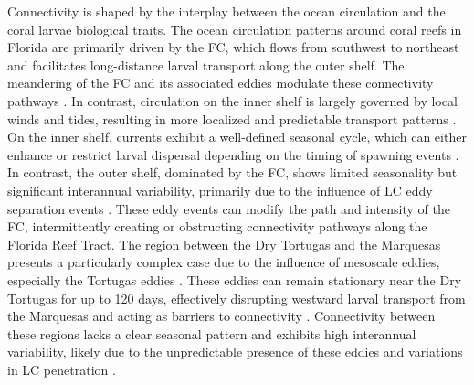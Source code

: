 \documentclass[preprint,12pt,authoryear]{elsarticle}
\begin{document}
	Connectivity is shaped by the interplay between the ocean circulation and the coral larvae biological traits. The ocean circulation patterns around coral reefs in Florida are primarily driven by the FC, which flows from southwest to northeast and facilitates long-distance larval transport along the outer shelf. The meandering of the FC and its associated eddies modulate these connectivity pathways \citep{lee1994evolution,kourafalou2012florida}. In contrast, circulation on the inner shelf is largely governed by local winds and tides, resulting in more localized and predictable transport patterns \citep{lee2002volume,liu2012seasonal}. On the inner shelf, currents exhibit a well-defined seasonal cycle, which can either enhance or restrict larval dispersal depending on the timing of spawning events \citep{liu2012seasonal}. In contrast, the outer shelf, dominated by the FC, shows limited seasonality but significant interannual variability, primarily due to the influence of LC eddy separation events \citep{kourafalou2012florida}. These eddy events can modify the path and intensity of the FC, intermittently creating or obstructing connectivity pathways along the Florida Reef Tract. The region between the Dry Tortugas and the Marquesas presents a particularly complex case due to the influence of mesoscale eddies, especially the Tortugas eddies \citep{dobbelaere2022connecting}. These eddies can remain stationary near the Dry Tortugas for up to 120 days, effectively disrupting westward larval transport from the Marquesas and acting as barriers to connectivity \citep{fratantoni1998influence,kourafalou2012florida}. Connectivity between these regions lacks a clear seasonal pattern and exhibits high interannual variability, likely due to the unpredictable presence of these eddies and variations in LC penetration \citep{lee1994evolution}.
	
\end{document}
